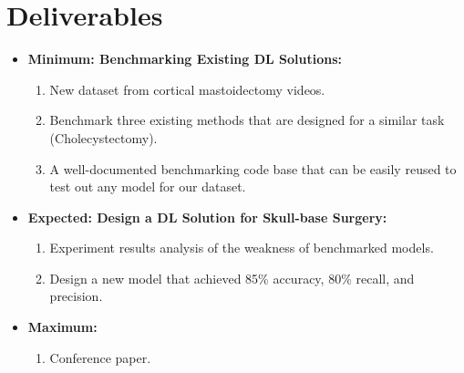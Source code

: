\documentclass[11pt]{article} \usepackage[top=1in, bottom=1in, left=1in, right=1in]{geometry}
\begin{document}
\section{Deliverables}
\begin{itemize}
            \item \textbf{Minimum: Benchmarking Existing DL Solutions:}
            \begin{enumerate}
                \item New dataset from cortical mastoidectomy videos.
                \item Benchmark three existing methods that are designed for a similar task (Cholecystectomy).
                \item A well-documented benchmarking code base that can be easily reused to test out any model for our dataset.
            \end{enumerate}
            \item \textbf{Expected: Design a DL Solution for Skull-base Surgery:}
            \begin{enumerate}
                \item Experiment results analysis of the weakness of benchmarked models.
                \item Design a new model that achieved 85\% accuracy, 80\% recall, and precision.
            \end{enumerate}
            \item \textbf{Maximum:}
            \begin{enumerate}
                \item Conference paper.
            \end{enumerate}
        \end{itemize}
\end{document}
